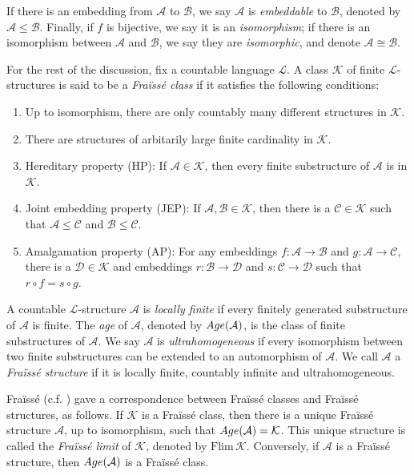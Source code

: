 \documentclass{amsart}
\theoremstyle{definition}
\theoremstyle{remark}
\begin{document}
If there is an embedding from $\mathcal{A}$ to $\mathcal{B}$, we say $\mathcal{A}$ is {\em embeddable} to $\mathcal{B}$, denoted by $\mathcal{A} \leq \mathcal{B}$. Finally, if $f$ is bijective, we say it is an {\em isomorphism}; if there is an isomorphism between $\mathcal{A}$ and $\mathcal{B}$, we say they are {\em isomorphic}, and denote $\mathcal{A} \cong \mathcal{B}$. 

    For the rest of the discussion, fix a countable language $\mathcal{L}$. A class $\mathcal{K}$ of finite $\mathcal{L}$-structures is said to be a {\em Fra\"iss\'e class} if it satisfies the following conditions: 
    \begin{enumerate}
        \item Up to isomorphism, there are only countably many different structures in $\mathcal{K}$. 
        \item There are structures of arbitarily large finite cardinality in $\mathcal{K}$. 
        \item Hereditary property (HP): If $\mathcal{A} \in \mathcal{K}$, then every finite substructure of $\mathcal{A}$ is in $\mathcal{K}$. 
        \item Joint embedding property (JEP): If $\mathcal{A}, \mathcal{B} \in \mathcal{K}$, then there is a $\mathcal{C} \in \mathcal{K}$ such that $\mathcal{A} \leq \mathcal{C}$ and $\mathcal{B} \leq \mathcal{C}$. 
        \item Amalgamation property (AP): For any embeddings $f: \mathcal{A} \rightarrow \mathcal{B}$ and $g:\mathcal{A} \rightarrow \mathcal{C}$, there is a $\mathcal{D} \in \mathcal{K}$ and embeddings $r:\mathcal{B} \rightarrow \mathcal{D}$ and $s: \mathcal{C} \rightarrow \mathcal{D}$ such that $r\circ f=s\circ g$.   
    \end{enumerate}

A countable $\mathcal{L}$-structure $\mathcal{A}$ is {\em locally finite} if every finitely generated substructure of $\mathcal{A}$ is finite. The {\em age} of $\mathcal{A}$, denoted by ${\rm Age}(\mathcal{A})$, is the class of finite substructures of $\mathcal{A}$. We say $\mathcal{A}$ is {\em ultrahomogeneous} if every isomorphism between two finite substructures can be extended to an automorphism of $\mathcal{A}$. We call $\mathcal{A}$ a {\em Fra\"iss\'e structure} if it is locally finite, countably infinite and ultrahomogeneous. 

Fra\"iss\'e \cite{Fraisse} (c.f. \cite{Hodges}) gave a correspondence between Fra\"iss\'e classes and Fra\"iss\'e structures, as follows. If $\mathcal{K}$ is a Fra\"iss\'e class, then there is a unique Fra\"iss\'e structure $\mathcal{A}$, up to isomorphism, such that ${\rm Age}(\mathcal{A}) =\mathcal{K}$. This unique structure is called the {\em Fra\"iss\'e limit} of $\mathcal{K}$, denoted by $\mbox{Flim}\,{\mathcal{K}}$. Conversely, if $\mathcal{A}$ is a Fra\"iss\'e structure, then ${\rm Age}(\mathcal{A})$ is a Fra\"iss\'e class. 
\end{document}
